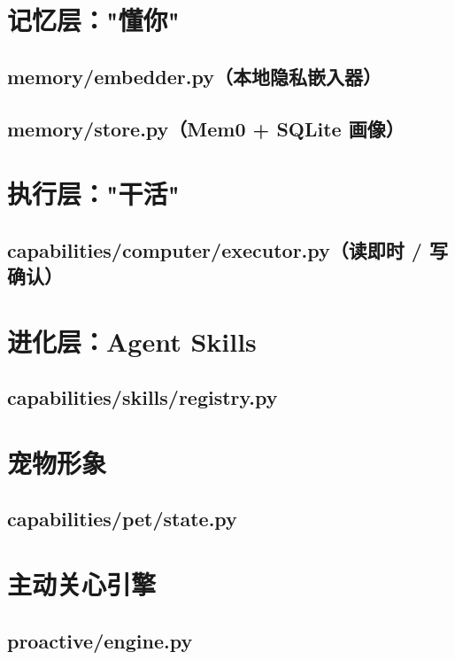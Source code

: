 \section{记忆层："懂你"}
\subsection{memory/embedder.py（本地隐私嵌入器）}

\subsection{memory/store.py（Mem0 + SQLite 画像）}


\section{执行层："干活"}
\subsection{capabilities/computer/executor.py（读即时 / 写确认）}


\section{进化层：Agent Skills}
\subsection{capabilities/skills/registry.py}


\section{宠物形象}
\subsection{capabilities/pet/state.py}


\section{主动关心引擎}
\subsection{proactive/engine.py}

